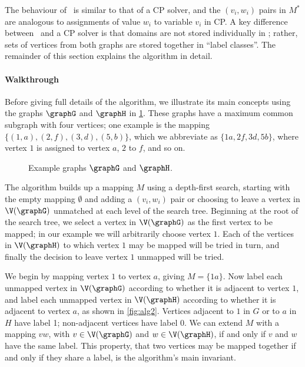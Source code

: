 The behaviour of \McSplit\ is similar to that of a CP solver, and the
$(v_i, w_i)$
pairs in $M^*$ are analogous to assignments of value $w_i$ to variable $v_i$ in CP.
A key difference between \McSplit\ and a CP solver is that domains are not
stored individually in \McSplit; rather, sets of vertices from both graphs
are stored together in ``label classes''.  The remainder of this section explains
the algorithm in detail.

\paragraph{Walkthrough} Before giving full details of the algorithm, we illustrate
its main concepts using the graphs $\graphG$ and $\graphH$ in
\cref{fig:alg1}.  These graphs have a maximum common subgraph with four
vertices; one example is the mapping
$\{(1,a), (2,f), (3,d), (5,b)\}$,
which we abbreviate as
$\{1a, 2f, 3d, 5b\}$,
where vertex $1$ is
assigned to vertex $a$, $2$ to $f$, and so on.

\begin{figure}[htb]
\centering
    \exampleG
    \qquad
    \exampleH
\caption{Example graphs $\graphG$ and $\graphH$.}
\label{fig:alg1}
\end{figure}

The algorithm builds up a mapping $M$ using a depth-first search, starting with the empty mapping
$\emptyset$ and adding a $(v_i, w_i)$ pair or choosing to leave a vertex in $\V(\graphG)$ unmatched at each level of the search tree.
Beginning at the root of the search tree, we
select a vertex in $\V(\graphG)$ as the first vertex to be mapped; in our
example we will arbitrarily choose vertex $1$. Each of the vertices in
$\V(\graphH)$ to which vertex $1$ may be mapped will be tried in turn, and
finally the decision to leave vertex $1$ unmapped will be tried.

We begin by mapping vertex $1$ to vertex $a$, giving $M=\{1a\}$.  Now
label each unmapped vertex in $\V(\graphG)$ according to whether it is adjacent to vertex $1$, and
label each unmapped vertex in $\V(\graphH)$ according to whether it is adjacent to vertex $a$,
as shown in \cref{fig:alg2}.  Vertices adjacent to $1$ in $G$ or to $a$ in $H$
have label 1; non-adjacent vertices have label 0.  We can extend $M$
with a mapping $vw$, with $v \in \V(\graphG)$ and $w \in \V(\graphH)$, if and only
if $v$ and $w$ have the same label.  This property, that two vertices may be
mapped together if and only if they share a label, is the algorithm's main
invariant.

